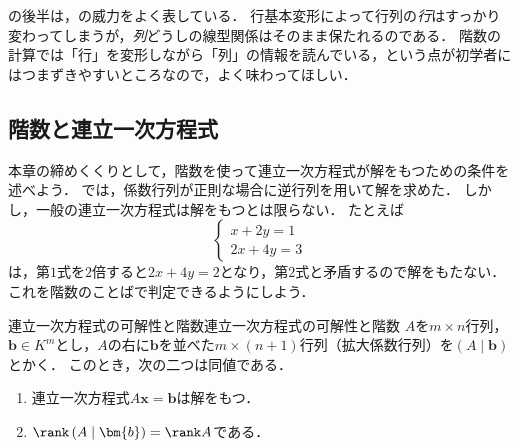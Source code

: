 の後半は，の威力をよく表している．
行基本変形によって行列の\emph{行}はすっかり変わってしまうが，\emph{列}どうしの線型関係はそのまま保たれるのである．
階数の計算では「行」を変形しながら「列」の情報を読んでいる，という点が初学者にはつまずきやすいところなので，よく味わってほしい．

\subsection{階数と連立一次方程式}

本章の締めくくりとして，階数を使って連立一次方程式が解をもつための条件を述べよう．
では，係数行列が正則な場合に逆行列を用いて解を求めた．
しかし，一般の連立一次方程式は解をもつとは限らない．
たとえば
\[
  \begin{cases}
    x + 2y = 1 \\
    2x + 4y = 3
  \end{cases}
\]
は，第$1$式を$2$倍すると$2x + 4y = 2$となり，第$2$式と矛盾するので解をもたない．
これを階数のことばで判定できるようにしよう．

\begin{prop}{連立一次方程式の可解性と階数}{連立一次方程式の可解性と階数}
  $A$を$m \times n$行列，$\bm{b} \in K^m$とし，$A$の右に$\bm{b}$を並べた$m \times (n+1)$行列（拡大係数行列）を$(A \mid \bm{b})$とかく．
  このとき，次の二つは同値である．
  \begin{enumerate}[label=(\roman*),leftmargin=3.2em]
    \item 連立一次方程式$A\bm{x} = \bm{b}$は解をもつ．
    \item $\rank\, (A \mid \bm{b}) = \rank A$である．
  \end{enumerate}
\end{prop}

